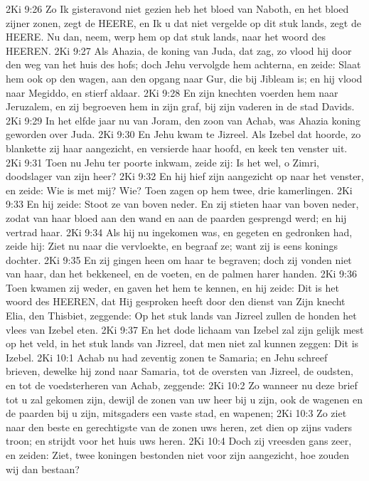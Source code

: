 2Ki 9:26  Zo Ik gisteravond niet gezien heb het bloed van Naboth, en het bloed zijner zonen, zegt de HEERE, en Ik u dat niet vergelde op dit stuk lands, zegt de HEERE. Nu dan, neem, werp hem op dat stuk lands, naar het woord des HEEREN.
2Ki 9:27  Als Ahazia, de koning van Juda, dat zag, zo vlood hij door den weg van het huis des hofs; doch Jehu vervolgde hem achterna, en zeide: Slaat hem ook op den wagen, aan den opgang naar Gur, die bij Jibleam is; en hij vlood naar Megiddo, en stierf aldaar.
2Ki 9:28  En zijn knechten voerden hem naar Jeruzalem, en zij begroeven hem in zijn graf, bij zijn vaderen in de stad Davids.
2Ki 9:29  In het elfde jaar nu van Joram, den zoon van Achab, was Ahazia koning geworden over Juda.
2Ki 9:30  En Jehu kwam te Jizreel. Als Izebel dat hoorde, zo blankette zij haar aangezicht, en versierde haar hoofd, en keek ten venster uit.
2Ki 9:31  Toen nu Jehu ter poorte inkwam, zeide zij: Is het wel, o Zimri, doodslager van zijn heer?
2Ki 9:32  En hij hief zijn aangezicht op naar het venster, en zeide: Wie is met mij? Wie? Toen zagen op hem twee, drie kamerlingen.
2Ki 9:33  En hij zeide: Stoot ze van boven neder. En zij stieten haar van boven neder, zodat van haar bloed aan den wand en aan de paarden gesprengd werd; en hij vertrad haar.
2Ki 9:34  Als hij nu ingekomen was, en gegeten en gedronken had, zeide hij: Ziet nu naar die vervloekte, en begraaf ze; want zij is eens konings dochter.
2Ki 9:35  En zij gingen heen om haar te begraven; doch zij vonden niet van haar, dan het bekkeneel, en de voeten, en de palmen harer handen.
2Ki 9:36  Toen kwamen zij weder, en gaven het hem te kennen, en hij zeide: Dit is het woord des HEEREN, dat Hij gesproken heeft door den dienst van Zijn knecht Elia, den Thisbiet, zeggende: Op het stuk lands van Jizreel zullen de honden het vlees van Izebel eten.
2Ki 9:37  En het dode lichaam van Izebel zal zijn gelijk mest op het veld, in het stuk lands van Jizreel, dat men niet zal kunnen zeggen: Dit is Izebel.
2Ki 10:1  Achab nu had zeventig zonen te Samaria; en Jehu schreef brieven, dewelke hij zond naar Samaria, tot de oversten van Jizreel, de oudsten, en tot de voedsterheren van Achab, zeggende:
2Ki 10:2  Zo wanneer nu deze brief tot u zal gekomen zijn, dewijl de zonen van uw heer bij u zijn, ook de wagenen en de paarden bij u zijn, mitsgaders een vaste stad, en wapenen;
2Ki 10:3  Zo ziet naar den beste en gerechtigste van de zonen uws heren, zet dien op zijns vaders troon; en strijdt voor het huis uws heren.
2Ki 10:4  Doch zij vreesden gans zeer, en zeiden: Ziet, twee koningen bestonden niet voor zijn aangezicht, hoe zouden wij dan bestaan?
